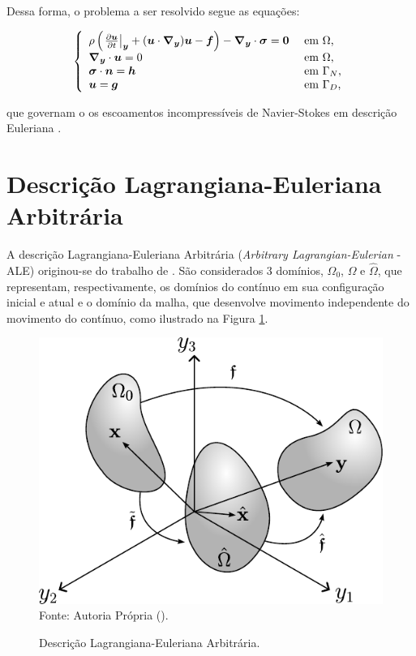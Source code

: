 Dessa forma, o problema a ser resolvido segue as equações:

\begin{equation}
    \left\{
    \begin{array}{ll}
        \rho\left({\left.\frac{\partial \boldsymbol{u}}{\partial t}\right|_{\boldsymbol{y}}+(\boldsymbol{u}\cdot\boldsymbol{\nabla_y})\boldsymbol{u}-\boldsymbol{f}}\right)-\boldsymbol{\nabla_y}\cdot\boldsymbol{\sigma}=\boldsymbol{0} & \text{ em }\Omega\text{,}   \\
        \boldsymbol{\nabla_y}\cdot\boldsymbol{u}=0                                                               & \text{ em }\Omega\text{,}   \\
        \boldsymbol{\sigma}\cdot\boldsymbol{n}=\boldsymbol{h}                                                        & \text{ em }\Gamma_N\text{,} \\
        \boldsymbol{u}=\boldsymbol{g}                                                                  & \text{ em }\Gamma_D\text{,}
    \end{array}
    \right.
    \label{eq:NS-Euler}
\end{equation}

\noindent que governam o os escoamentos incompressíveis de Navier-Stokes em descrição Euleriana \cite{bazilevs2013computational,bazilevs2010large,bazilevs2007variational,hughes2002variational,hughes2000large}.

\section{Descrição Lagrangiana-Euleriana Arbitrária} \label{CFD-ALE}

A descrição Lagrangiana-Euleriana Arbitrária (\textit{Arbitrary Lagrangian-Eulerian} - ALE) originou-se do trabalho de . São considerados 3 domínios, $\Omega_0$, $\Omega$ e $\hat{\Omega}$, que representam, respectivamente, os domínios do contínuo em sua configuração inicial e atual e o domínio da malha, que desenvolve movimento independente do movimento do contínuo, como ilustrado na Figura \ref{Fig:ALE}.

\begin{figure}[h!]
    \centering
    \caption{Descrição Lagrangiana-Euleriana Arbitrária.}
    \includegraphics[width=.45\linewidth]{Figuras/ALE.pdf}
    \label{Fig:ALE}
    \\Fonte: Autoria Própria (\the\year).
\end{figure}

